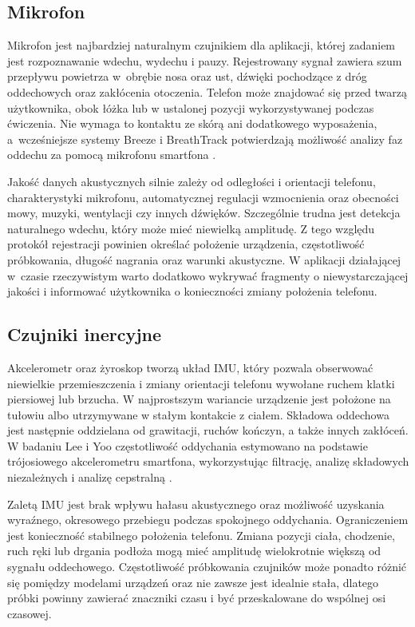 \subsection{Mikrofon}

Mikrofon jest najbardziej naturalnym czujnikiem dla aplikacji, której zadaniem jest rozpoznawanie wdechu, wydechu i pauzy. Rejestrowany sygnał zawiera szum przepływu powietrza w~obrębie nosa oraz ust, dźwięki pochodzące z dróg oddechowych oraz zakłócenia otoczenia. Telefon może znajdować się przed twarzą użytkownika, obok łóżka lub w ustalonej pozycji wykorzystywanej podczas ćwiczenia. Nie wymaga to kontaktu ze skórą ani dodatkowego wyposażenia, a~wcześniejsze systemy Breeze i BreathTrack potwierdzają możliwość analizy faz oddechu za pomocą mikrofonu smartfona \cite{10.1145/3369835,10.1145/3478123}.

Jakość danych akustycznych silnie zależy od odległości i orientacji telefonu, charakterystyki mikrofonu, automatycznej regulacji wzmocnienia oraz obecności mowy, muzyki, wentylacji czy innych dźwięków. Szczególnie trudna jest detekcja naturalnego wdechu, który może mieć niewielką amplitudę. Z tego względu protokół rejestracji powinien określać położenie urządzenia, częstotliwość próbkowania, długość nagrania oraz warunki akustyczne. W aplikacji działającej w~czasie rzeczywistym warto dodatkowo wykrywać fragmenty o niewystarczającej jakości i informować użytkownika o konieczności zmiany położenia telefonu.

\subsection{Czujniki inercyjne}

Akcelerometr oraz żyroskop tworzą układ IMU, który pozwala obserwować niewielkie przemieszczenia i zmiany orientacji telefonu wywołane ruchem klatki piersiowej lub brzucha. W najprostszym wariancie urządzenie jest położone na tułowiu albo utrzymywane w stałym kontakcie z ciałem. Składowa oddechowa jest następnie oddzielana od grawitacji, ruchów kończyn, a także innych zakłóceń. W badaniu Lee i Yoo częstotliwość oddychania estymowano na podstawie trójosiowego akcelerometru smartfona, wykorzystując filtrację, analizę składowych niezależnych i analizę cepstralną \cite{lee2020smartphoneRespiration}.

Zaletą IMU jest brak wpływu hałasu akustycznego oraz możliwość uzyskania wyraźnego, okresowego przebiegu podczas spokojnego oddychania. Ograniczeniem jest konieczność stabilnego położenia telefonu. Zmiana pozycji ciała, chodzenie, ruch ręki lub drgania podłoża mogą mieć amplitudę wielokrotnie większą od sygnału oddechowego. Częstotliwość próbkowania czujników może ponadto różnić się pomiędzy modelami urządzeń oraz nie zawsze jest idealnie stała, dlatego próbki powinny zawierać znaczniki czasu i być przeskalowane do wspólnej osi czasowej.


